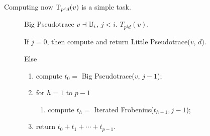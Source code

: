 Computing now $\operatorname{T}_{p^jd}(v)$ is a simple task.

\begin{figure}[h]
  \begin{algorithm}
    {Big Pseudotrace}
    {$v\dashv\mathbb{U}_i$, $j<i$.}
    {$T_{p^jd}(v)$.}
  \item \label{alg:pseudo:base}If $j = 0$, then compute and return
    Little Pseudotrace($v$, $d$).
  \item Else
    \begin{enumerate}
    \item \label{alg:pseudo:rec}compute $t_0 = $ Big Pseudotrace($v$,
      $j-1$);
    \item \label{alg:pseudo:frob}for $h = 1$ to $p-1$
      \begin{enumerate}
      \item compute $t_h = $ Iterated Frobenius($t_{h-1}, j-1$);
      \end{enumerate}
    \item \label{alg:pseudo:sum}return $t_0 + t_1 + \cdots + t_{p-1}$.
    \end{enumerate}
  \end{algorithm}
\end{figure}

